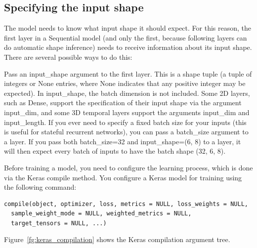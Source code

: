 \subsection{Specifying the input shape}
The model needs to know what input shape it should expect. For this reason, the first layer in a Sequential model (and only the first, because following layers can do automatic shape inference) needs to receive information about its input shape. There are several possible ways to do this:

Pass an input\_shape argument to the first layer. This is a shape tuple (a tuple of integers or None entries, where None indicates that any positive integer may be expected). In input\_shape, the batch dimension is not included.
Some 2D layers, such as Dense, support the specification of their input shape via the argument input\_dim, and some 3D temporal layers support the arguments input\_dim and input\_length.
If you ever need to specify a fixed batch size for your inputs (this is useful for stateful recurrent networks), you can pass a batch\_size argument to a layer. If you pass both batch\_size=32 and input\_shape=(6, 8) to a layer, it will then expect every batch of inputs to have the batch shape (32, 6, 8).

Before training a model, you need to configure the learning process, which is done via the Keras compile method. You configure a Keras model for training using the following command:
\begin{verbatim}
compile(object, optimizer, loss, metrics = NULL, loss_weights = NULL,
  sample_weight_mode = NULL, weighted_metrics = NULL,
  target_tensors = NULL, ...)
\end{verbatim}
Figure~\ref{fg:keras_compilation} shows the Keras compilation argument tree. 

